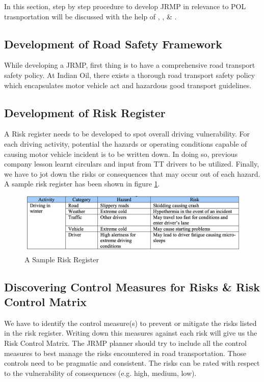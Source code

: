 \documentclass[paper=letter, fontsize=12pt]{article}
\begin{document}
In this section, step by step procedure to develop JRMP in relevance to POL trasnportation will be discussed with the help of \cite{retzer1}, \cite{waters}, \& \cite{pune}.

\subsection{Development of Road Safety Framework}
While developing a JRMP, first thing is to have a comprehensive road transport safety policy. At Indian Oil, there exists a thorough road transport safety policy which encapsulates motor vehicle act and hazardous good transport guidelines.

\subsection{Development of Risk Register}

A Risk register needs to be developed to spot overall driving vulnerability. For each driving activity, potential the hazards or operating conditions capable of causing motor vehicle incident is to be written down. In doing so, previous company lesson learnt circulars and input from TT drivers to be utilized. Finally, we have to jot down the risks or consequences that may occur out of each hazard. A sample risk register has been shown in figure \ref{risk_register}.

 \begin{figure}[htpb]
    \centering
    \includegraphics[scale = 0.4]{riskreg}
    \caption{A Sample Risk Register \cite{retzer1}}
    \label{risk_register}
\end{figure}


\subsection{Discovering Control Measures for Risks \& Risk Control Matrix}

We have to identify the control measure(s) to prevent or mitigate the risks listed in the risk register. Writing down this measures against each risk will give us the Risk Control Matrix. The JRMP planner should try to include all the control measures to best manage the risks encountered in road transportation. Those controls need to be pragmatic and consistent.
The risks can be rated with respect to the vulnerability of consequences (e.g. high, medium, low).
\end{document}
